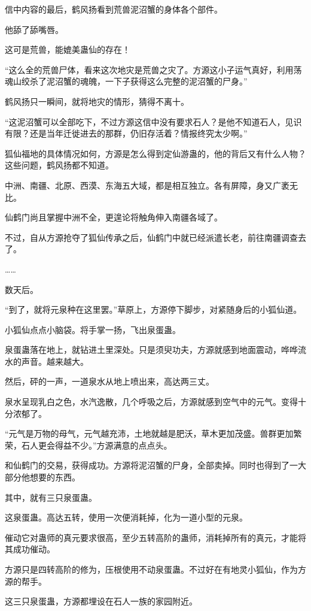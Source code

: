 \begin{this_body}
信中内容的最后，鹤风扬看到荒兽泥沼蟹的身体各个部件。

他舔了舔嘴唇。

这可是荒兽，能媲美蛊仙的存在！

“这么全的荒兽尸体，看来这次地灾是荒兽之灾了。方源这小子运气真好，利用荡魂山绞杀了泥沼蟹的魂魄，一下子获得这么完整的泥沼蟹的尸身。”

鹤风扬只一瞬间，就将地灾的情形，猜得不离十。

“这泥沼蟹可以全部吃下，不过方源这信中没有要求石人？是他不知道石人，见识有限？还是当年迁徙进去的那群，仍旧存活着？情报终究太少啊。”

狐仙福地的具体情况如何，方源是怎么得到定仙游蛊的，他的背后又有什么人物？这些问题，鹤风扬都不知道。

中洲、南疆、北原、西漠、东海五大域，都是相互独立。各有屏障，身又广袤无比。

仙鹤门尚且掌握中洲不全，更遑论将触角伸入南疆各域了。

不过，自从方源抢夺了狐仙传承之后，仙鹤门中就已经派遣长老，前往南疆调查去了。

……

数天后。

“到了，就将元泉种在这里罢。”草原上，方源停下脚步，对紧随身后的小狐仙道。

小狐仙点点小脑袋。将手掌一扬，飞出泉蛋蛊。

泉蛋蛊落在地上，就钻进土里深处。只是须臾功夫，方源就感到地面震动，哗哗流水的声音。越来越大。

然后，砰的一声，一道泉水从地上喷出来，高达两三丈。

泉水呈现乳白之色，水汽逸散，几个呼吸之后，方源就感到空气中的元气。变得十分浓郁了。

“元气是万物的母气，元气越充沛，土地就越是肥沃，草木更加茂盛。兽群更加繁荣，石人更会得益不少。”方源满意的点点头。

和仙鹤门的交易，获得成功。方源将泥沼蟹的尸身，全部卖掉。同时也得到了一大部分他想要的东西。

其中，就有三只泉蛋蛊。

这泉蛋蛊。高达五转，使用一次便消耗掉，化为一道小型的元泉。

催动它对蛊师的真元要求很高，至少五转高阶的蛊师，消耗掉所有的真元，才能将其成功催动。

方源只是四转高阶的修为，压根使用不动泉蛋蛊。不过好在有地灵小狐仙，作为方源的帮手。

这三只泉蛋蛊，方源都埋设在石人一族的家园附近。


\end{this_body}

